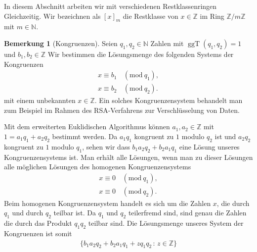 \documentclass[
a4paper,landscape,16pt,
bibliography=totocnumbered,
numbers=noenddot,
]{scrartcl}
\numberwithin{equation}{subsection}
\newcommand{\N}{\mathbb N}
\newcommand{\Z}{\mathbb Z}
\newcommand{\ggT}{\operatorname{ggT}} %
\theoremstyle{plain}
\theoremstyle{definition}
\newtheorem*{bem}{Bemerkung}
\begin{document}
In diesem Abschnitt arbeiten wir mit verschiedenen Restklassenringen Gleichzeitig. Wir bezeichnen als $[x]_m$ die Restklasse von $x \in \Z$ im Ring $\Z / m \Z$ mit $m \in \N$. 

\newcommand{\mymod}[1]{\,(\mathrm{mod} \ #1)}
\begin{bem}[Kongruenzen]
	Seien $q_1, q_2 \in \N$ Zahlen mit $\ggT(q_1, q_2) = 1$ und $b_1, b_2 \in \Z$ Wir bestimmen die Lösungsmenge des folgenden Systems der Kongruenzen
	\begin{align*}
			x \equiv b_1 & \mymod{q_1},
			\\ x \equiv b_2 & \mymod{q_2}.
	\end{align*}
	mit einem unbekannten $x \in \Z$. Ein solches Kongruenzensystem behandelt man zum Beispiel im Rahmen des RSA-Verfahrens zur Verschlüsselung von Daten.  
	
	Mit dem erweiterten Euklidischen Algorithmus können $a_1, a_2 \in \Z$ mit $1 = a_1 q_1 + a_2 q_2$ bestimmt werden. Da $a_1 q_1$ kongruent zu $1$ modulo $q_2$ ist und $a_2 q_2$ kongruent zu $1$ modulo $q_1$, sehen wir dass $b_1 a_2 q_2 + b_2 a_1 q_1$ eine Lösung unseres Kongruenzensystems ist. Man erhält alle Lösungen, wenn man zu dieser Lösungen alle möglichen Lösungen des homogenen Kongruenzensystems 
	\begin{align*}
	x \equiv 0 & \mymod{q_1},
	\\ x \equiv 0 & \mymod{q_2}.
\end{align*}
	Beim homogenen Kongruenzensystem handelt es sich um die Zahlen $x$, die durch $q_1$ und durch $q_2$ teilbar ist. Da $q_1$ und $q_2$ teilerfremd sind, sind genau die Zahlen die durch das Produkt $q_1 q_2$ teilbar sind. Die Lösungsmenge unseres System der Kongruenzen ist somit 
	\begin{align*}
			\{  b_1 a_2 q_2 + b_2 a_1 q_1 + z q_1 q_2  \,:\, z \in \Z \}
	\end{align*} 
\end{bem} 
\end{document}
